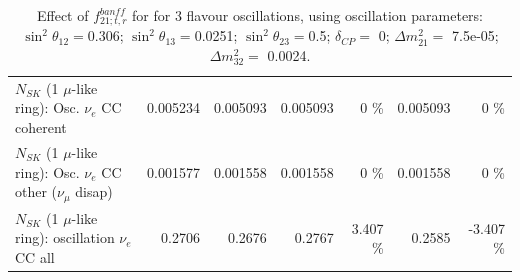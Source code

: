 \begin{table}
\begin{tabular}{| l | r | r | r  r | r  r |}
                          $N_{SK}$ (1 $\mu$-like ring): Osc. $\nu_e$ CC coherent &        0.005234 &        0.005093 &        0.005093 &        0 \%  &        0.005093 &        0 \%  \\ 
           $N_{SK}$ (1 $\mu$-like ring): Osc. $\nu_e$ CC other ($\nu_\mu$ disap) &        0.001577 &        0.001558 &        0.001558 &        0 \%  &        0.001558 &        0 \%  \\ 
                        $N_{SK}$ (1 $\mu$-like ring): oscillation $\nu_e$ CC all &          0.2706 &          0.2676 &          0.2767 &    3.407 \%  &          0.2585 &   -3.407 \%  \\ 
\hline
\hline
\end{tabular}
\caption{ Effect of $f_{21; t, r}^{banff}$ for for 3 flavour oscillations, using oscillation parameters:  $\sin^2\theta_{12} = $0.306; $\sin^2\theta_{13} = $0.0251; $\sin^2\theta_{23} = $0.5; $\delta_{CP} = $        0; $\Delta m^2_{21} = $    7.5e-05; $\Delta m^2_{32} = $    0.0024. }
\label{tab:num_banff_cc1piE0_1RmuT_3f_osc_t13:0.0251}
\end{table}
\clearpage
